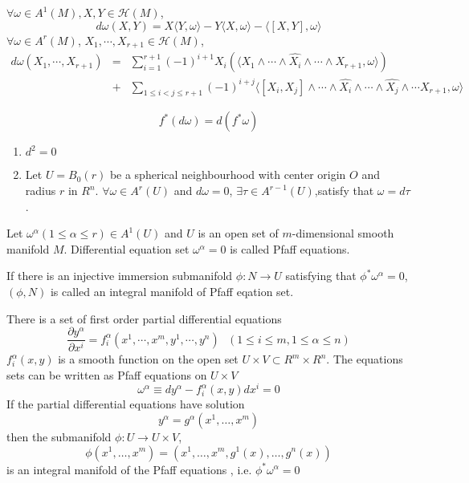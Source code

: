\begin{newthem}
$\forall \omega \in A^1(M),X,Y \in \mathcal{H}(M)$,
\[d\omega(X,Y) = X \langle Y,\omega \rangle -Y \langle X,\omega \rangle -\langle [X,Y],\omega \rangle \] 
$\forall \omega \in A^r(M)$, $X_1,\cdots,X_{r+1} \in \mathcal{H}(M)$,
\begin{eqnarray}
d\omega(X_1,\cdots,X_{r+1}) &=& \sum_{i=1}^{r+1}(-1)^{i+1} X_{i}(\langle X_1 \wedge \cdots \wedge \hat{X_i} \wedge \cdots \wedge X_{r+1},\omega \rangle) \nonumber \\
&+& \sum_{1 \leq i < j \leq r+1}(-1)^{i+j} \langle [X_i,X_j] \wedge \cdots \wedge \hat{X_i} \wedge \cdots \wedge \hat{X_j} \wedge \cdots X_{r+1},\omega \rangle \nonumber
\end{eqnarray}
\end{newthem}

\begin{newthem}
\[f^{*}(d\omega) = d(f^* \omega)\]
\end{newthem}

\begin{newlemma}
\begin{enumerate}
\item $d^2=0$
\item Let $U=B_0(r)$ be a spherical neighbourhood with center origin $O$ and radius $r$ in $R^n$. $\forall \omega \in A^r(U)$ and $d\omega =0$, $\exists \tau \in A^{r-1}(U)$,satisfy that $\omega = d\tau$.
\end{enumerate}
\end{newlemma}

\begin{newdef}
Let $\omega^{\alpha}(1 \leq \alpha \leq r) \in A^1(U)$ and $U$ is an open set of $m$-dimensional smooth manifold $M$. Differential equation set $\omega^{\alpha} = 0$ is called Pfaff equations.
\end{newdef}

\begin{newdef}
If there is an injective immersion submanifold $\phi:N \to U$ satisfying that $\phi^{*} \omega^{\alpha} = 0$,$(\phi,N)$ is called an integral manifold of Pfaff eqation set.
\end{newdef}

\begin{newprop}
There is a set of first order partial differential equations
\[\frac{\partial y^{\alpha}}{\partial x^i} = f^{\alpha}_{i}(x^1,\cdots,x^{m},y^1,\cdots,y^{n}) \ \ \ (1 \leq i \leq m,1 \leq \alpha \leq n)\]
$f^{\alpha}_{i}(x,y)$ is a smooth function on the open set $U \times V \subset R^m \times R^n$. The equations sets can be written as Pfaff equations on $U \times V$
\[\omega^{\alpha} \equiv dy^{\alpha} - f^{\alpha}_{i}(x,y)dx^i = 0\]
If the partial differential equations have solution
\[y^{\alpha} = g^{\alpha}(x^1,\ldots,x^m)\]
then the submanifold $\phi:U \to U \times V$,
\[\phi(x^1,\ldots,x^m) = (x^1,\ldots,x^m,g^1(x),\ldots,g^n(x))\]
is an integral manifold of the Pfaff equations , i.e. $\phi^* \omega^{\alpha} =0$
\end{newprop}


